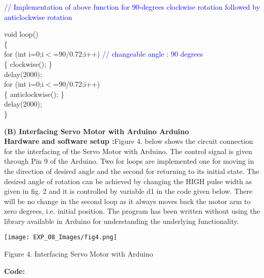 \documentclass[12pt,a4paper]{article}
\begin{document}
\begin{center}\textcolor{blue}{// Implementation of above function for 90-degrees clockwise rotation followed by anticlockwise rotation}\end{center}
\vspace{20mm}

void loop() \\
\{  \\                  
 for (int i=0;i$<$=90/0.72;i++) \hspace{12pt} \textcolor{blue}{// changeable angle : 90 degrees \\}
 \{  clockwise();  \}\\
  delay(2000);\\

  for (int i=0;i$<$=90/0.72;i++)\\
  \{ anticlockwise(); \}\\
  delay(2000);\\
\}\par

\setlength{\parindent}{0pt}
\begin{justify}
\textbf{(B)	Interfacing Servo Motor with Arduino Arduino}\\[3pt]
{\textbf{Hardware and software setup :}Figure 4. below shows the circuit connection for the interfacing of the Servo Motor with Arduino. The control signal is given through Pin  9 of the Arduino. Two for loops are implemented one for moving in the direction of  desired angle and the second for returning to its initial state. The desired angle of rotation can be achieved by changing the HIGH pulse width as given in fig. 2 and it is controlled by variable d1 in the code given below. There will be no change in the second loop as it always moves back the motor arm to zero degrees, i.e. initial position. The program has been written without using the library available in Arduino for understanding the underlying functionality.}\end{justify}


\begin{center} 
\texttt{[image: EXP\_08\_Images/fig4.png]}
\end{center}

\begin{center} {Figure 4. Interfacing Servo Motor with Arduino}\end{center}

\vspace{50mm}

\hspace{2cm}\textbf{\large Code:}\\[6pt]
\end{document}
